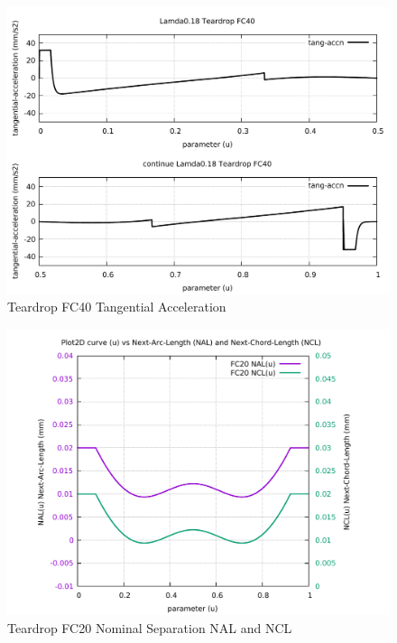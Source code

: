 \begin{figure}
	\caption     {Teardrop FC40 Tangential Acceleration}
	\label{24-img-Teardrop-FC40-Tangential-Acceleration.pdf}
	\includegraphics[width=1.00\textwidth]{Chap4/appendix/app-Teardrop/plots/24-img-Teardrop-FC40-Tangential-Acceleration.pdf}
\end{figure}

\clearpage
\pagebreak

\begin{figure}
	\caption     {Teardrop FC20 Nominal Separation NAL and NCL}
	\label{25-img-Teardrop-FC20-Nominal-Separation-NAL-and-NCL.pdf}
	\includegraphics[width=1.00\textwidth]{Chap4/appendix/app-Teardrop/plots/25-img-Teardrop-FC20-Nominal-Separation-NAL-and-NCL.pdf}
\end{figure}


